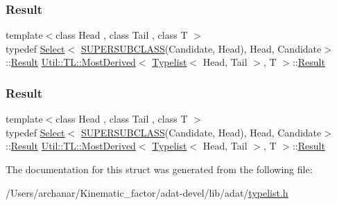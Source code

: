 \subsubsection{\texorpdfstring{Result}{Result}\hspace{0.1cm}{\footnotesize\ttfamily [2/3]}}
{\footnotesize\ttfamily template$<$class Head , class Tail , class T $>$ \\
typedef \mbox{\hyperlink{structUtil_1_1Select}{Select}}$<$ \mbox{\hyperlink{adat__devel__install_2include_2adat_2typemanip_8h_a2820bb39352560126da663542139bd9b}{S\+U\+P\+E\+R\+S\+U\+B\+C\+L\+A\+SS}}(Candidate, Head), Head, Candidate$>$\+::\mbox{\hyperlink{structUtil_1_1TL_1_1MostDerived_3_01Typelist_3_01Head_00_01Tail_01_4_00_01T_01_4_a70c1999c1e1c8426f47682c8a0289724}{Result}} \mbox{\hyperlink{structUtil_1_1TL_1_1MostDerived}{Util\+::\+T\+L\+::\+Most\+Derived}}$<$ \mbox{\hyperlink{structUtil_1_1Typelist}{Typelist}}$<$ Head, Tail $>$, T $>$\+::\mbox{\hyperlink{structUtil_1_1TL_1_1MostDerived_3_01Typelist_3_01Head_00_01Tail_01_4_00_01T_01_4_a70c1999c1e1c8426f47682c8a0289724}{Result}}}

\mbox{\label{structUtil_1_1TL_1_1MostDerived_3_01Typelist_3_01Head_00_01Tail_01_4_00_01T_01_4_a70c1999c1e1c8426f47682c8a0289724}} 
\subsubsection{\texorpdfstring{Result}{Result}\hspace{0.1cm}{\footnotesize\ttfamily [3/3]}}
{\footnotesize\ttfamily template$<$class Head , class Tail , class T $>$ \\
typedef \mbox{\hyperlink{structUtil_1_1Select}{Select}}$<$ \mbox{\hyperlink{adat__devel__install_2include_2adat_2typemanip_8h_a2820bb39352560126da663542139bd9b}{S\+U\+P\+E\+R\+S\+U\+B\+C\+L\+A\+SS}}(Candidate, Head), Head, Candidate$>$\+::\mbox{\hyperlink{structUtil_1_1TL_1_1MostDerived_3_01Typelist_3_01Head_00_01Tail_01_4_00_01T_01_4_a70c1999c1e1c8426f47682c8a0289724}{Result}} \mbox{\hyperlink{structUtil_1_1TL_1_1MostDerived}{Util\+::\+T\+L\+::\+Most\+Derived}}$<$ \mbox{\hyperlink{structUtil_1_1Typelist}{Typelist}}$<$ Head, Tail $>$, T $>$\+::\mbox{\hyperlink{structUtil_1_1TL_1_1MostDerived_3_01Typelist_3_01Head_00_01Tail_01_4_00_01T_01_4_a70c1999c1e1c8426f47682c8a0289724}{Result}}}



The documentation for this struct was generated from the following file\+:\begin{DoxyCompactItemize}
\item 
/\+Users/archanar/\+Kinematic\+\_\+factor/adat-\/devel/lib/adat/\mbox{\hyperlink{adat-devel_2lib_2adat_2typelist_8h}{typelist.\+h}}\end{DoxyCompactItemize}
